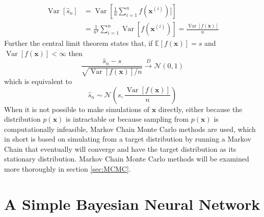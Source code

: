 \begin{equation*}
    \begin{split}
\operatorname{Var}\left[\hat{s}_{n}\right] &=\operatorname{Var}\left[\frac{1}{n} \sum_{i=1}^{n} f(\mathbf{x}^{(i)})]\right] \\ &=\frac{1}{n^{2}} \sum_{i=1}^{n} \operatorname{Var}[f(\mathbf{x}^{(i)})]
=\frac{\operatorname{Var}[f(\mathbf{x})]}{n}
\end{split}
\end{equation*}
Further the central limit theorem states that, if $\mathbb{E}[f(\mathbf{x})]=s$ and $\operatorname{Var}[f(\mathbf{x})]<\infty$ then
\begin{equation*}
    \frac{\hat{s}_{n}-s}{\sqrt{\operatorname{Var}[f(\mathbf{x})] / n}} \stackrel{D}{\rightarrow} \mathcal{N}(0,1)
\end{equation*}
which is equivalent to
\begin{equation*}
    \hat{s}_n\sim \mathcal{N}\left(s,\frac{\operatorname{Var}[f(\mathbf{x})]}{n}\right)
\end{equation*}
When it is not possible to make simulations of $\mathbf{x}$ directly, either because the distribution $p(\mathbf{x})$ is intractable or because sampling from $p(\mathbf{x})$ is computationally infeasible, Markov Chain Monte Carlo methods are used, which in short is based on simulating from a target distribution by running a Markov Chain that eventually will converge and have the target distribution as its stationary distribution. Markov Chain Monte Carlo methods will be examined more thoroughly in section \ref{sec:MCMC}.

\section{A Simple Bayesian Neural Network} \label{sec:simple_BNN}

